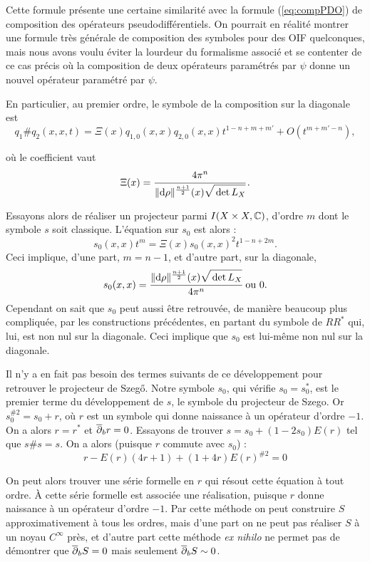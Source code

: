 \begin{rem}
Cette formule présente une certaine similarité avec la formule (\ref{eq:compPDO}) de composition des opérateurs pseudodifférentiels. On pourrait en réalité montrer une formule très générale de composition des symboles pour des OIF quelconques, mais nous avons voulu éviter la lourdeur du formalisme associé et se contenter de ce cas précis où la composition de deux opérateurs paramétrés par $\psi$ donne un nouvel opérateur paramétré par $\psi$.
\end{rem}

En particulier, au premier ordre, le symbole de la composition sur la diagonale est
\begin{equation*}
  q_1\#q_2(x,x,t) = \Xi(x)q_{1,0}(x,x)q_{2,0}(x,x)t^{1-n+m+m'} + O(t^{m+m'-n}),
\end{equation*}

où le coefficient vaut 
\begin{equation*}
	\Xi(x) = \cfrac{4\pi^n}{\|\dd\rho\|^{\frac{n+1}{2}}(x)\sqrt{\vphantom{\hat{A}}\det L_X}}\,.
\end{equation*}

Essayons alors de réaliser un projecteur parmi $I(X\times X,\mathbb{C})$, d'ordre $m$ dont le symbole $s$ soit classique. L'équation sur $s_0$ est alors :
\begin{equation*}
  s_0(x,x)t^m = \Xi(x)s_0(x,x)^2t^{1-n+2m}.
\end{equation*}
Ceci implique, d'une part, $m=n-1$, et d'autre part, sur la diagonale,
\begin{equation*}
  s_0(x,x) = \cfrac{\|\dd\rho\|^{\frac{n+1}{2}}(x)\sqrt{\vphantom{\hat{A}}\det L_X}}{4\pi^n} \text{ ou } 0.
\end{equation*}
Cependant on sait que $s_0$ peut aussi être retrouvée, de manière
beaucoup plus compliquée, par les constructions précédentes, en
partant du symbole de $RR^*$ qui, lui, est non nul sur la
diagonale. Ceci implique que $s_0$ est lui-même non nul sur la diagonale.

Il n'y a en fait pas besoin des termes suivants de ce développement pour retrouver le projecteur de Szeg\H{o}. Notre symbole $s_0$, qui vérifie $s_0 = s_0^*$, est le premier terme du développement de $s$, le symbole du projecteur de Szego. Or $s_0^{\#2}=s_0+r$, où $r$ est un symbole qui donne naissance à un opérateur d'ordre $-1$. On a alors $r=r^*$ et $\overline{\partial}_b r=0$. Essayons de trouver $s=s_0+(1-2s_0)E(r)$ tel que $s\#s=s$. On a alors (puisque $r$ commute avec $s_0$) :
\begin{equation*}
  r-E(r)(4r+1)+(1 + 4r)E(r)^{\#2}= 0
\end{equation*}

On peut alors trouver une série formelle en $r$ qui résout cette équation à tout ordre. À cette série formelle est associée une réalisation, puisque $r$ donne naissance à un opérateur d'ordre $-1$. Par cette méthode on peut construire $S$ approximativement à tous les ordres, mais d'une part on ne peut pas réaliser $S$ à un noyau $C^{\infty}$ près, et d'autre part cette méthode \emph{ex nihilo} ne permet pas de démontrer que $\overline{\partial}_b S=0$ mais seulement $\overline{\partial}_b S \sim 0$.
